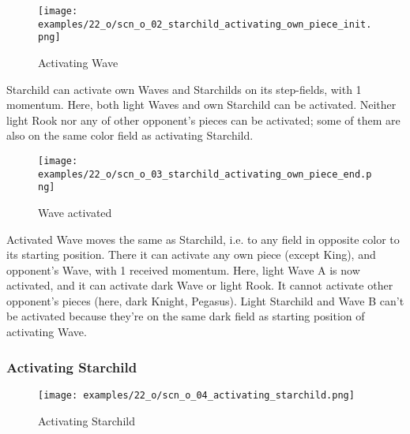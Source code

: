 \vspace*{-1.1\baselineskip}
\noindent
\begin{figure}[!h]
\texttt{[image: examples/22\_o/scn\_o\_02\_starchild\_activating\_own\_piece\_init.png]}
\caption{Activating Wave}
\label{fig:scn_o_02_starchild_activating_own_piece_init}
\end{figure}

Starchild can activate own Waves and Starchilds on its step-fields, with 1 momentum. Here,
both light Waves and own Starchild can be activated. Neither light Rook nor any of other
opponent's pieces can be activated; some of them are also on the same color field as
activating Starchild.

\clearpage %

\vspace*{-2.1\baselineskip}
\noindent
\begin{figure}[!h]
\texttt{[image: examples/22\_o/scn\_o\_03\_starchild\_activating\_own\_piece\_end.png]}
\caption{Wave activated}
\label{fig:scn_o_03_starchild_activating_own_piece_end}
\end{figure}

Activated Wave moves the same as Starchild, i.e. to any field in opposite color to its starting
position. There it can activate any own piece (except King), and opponent's Wave, with 1 received
momentum. Here, light Wave A is now activated, and it can activate dark Wave or light Rook. It
cannot activate other opponent's pieces (here, dark Knight, Pegasus). Light Starchild and Wave B
can't be activated because they're on the same dark field as starting position of activating Wave.

\clearpage %

\subsubsection*{Activating Starchild}

\vspace*{-1.3\baselineskip}
\noindent
\begin{figure}[!h]
\texttt{[image: examples/22\_o/scn\_o\_04\_activating\_starchild.png]}
\caption{Activating Starchild}
\label{fig:scn_o_04_activating_starchild}
\end{figure}

